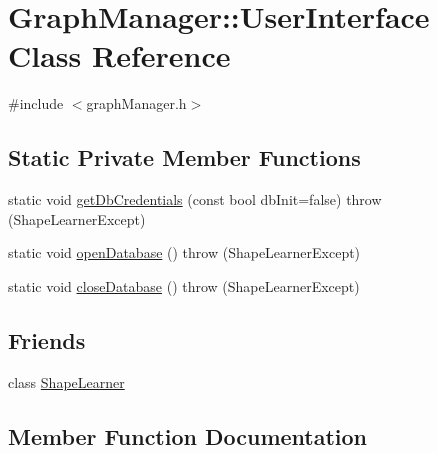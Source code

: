 \hypertarget{class_graph_manager_1_1_user_interface}{}\section{Graph\+Manager\+:\+:User\+Interface Class Reference}
\label{class_graph_manager_1_1_user_interface}


{\ttfamily \#include $<$graph\+Manager.\+h$>$}

\subsection*{Static Private Member Functions}
\begin{DoxyCompactItemize}
\item 
static void \hyperlink{class_graph_manager_1_1_user_interface_a47c09967d24c3305061a9caca792b77c}{get\+Db\+Credentials} (const bool db\+Init=false)  throw (\+Shape\+Learner\+Except)
\item 
static void \hyperlink{class_graph_manager_1_1_user_interface_ada0f9edd9fd2f324db10e038bfbdc133}{open\+Database} ()  throw (\+Shape\+Learner\+Except)
\item 
static void \hyperlink{class_graph_manager_1_1_user_interface_a7f00c04a117c80a213e33aa86f28e91f}{close\+Database} ()  throw (\+Shape\+Learner\+Except)
\end{DoxyCompactItemize}
\subsection*{Friends}
\begin{DoxyCompactItemize}
\item 
class \hyperlink{class_graph_manager_1_1_user_interface_a3a388a09d33d463cad9a452a65cab784}{Shape\+Learner}
\end{DoxyCompactItemize}


\subsection{Member Function Documentation}
\hypertarget{class_graph_manager_1_1_user_interface_a7f00c04a117c80a213e33aa86f28e91f}{}
